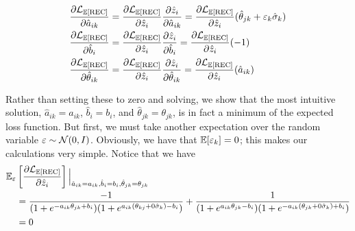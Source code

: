 \begin{equation}
  \begin{split}
  \frac{\partial \mathcal{L}_{\mathbb{E}[\text{REC}]}}{\partial \hat a_{ik}} &= 
  \frac{\partial \mathcal{L}_{\mathbb{E}[\text{REC}]}}{\partial \hat z_i}\frac{\partial \hat z_i}{\partial \hat a_{ik}} = \frac{\partial \mathcal{L}_{\mathbb{E}[\text{REC}]}}{\partial \hat z_i} (\hat \theta_{jk} + \varepsilon_k \hat \sigma_k) \\
  \frac{\partial \mathcal{L}_{\mathbb{E}[\text{REC}]}}{\partial \hat b_i} &= 
  \frac{\partial \mathcal{L}_{\mathbb{E}[\text{REC}]}}{\partial \hat z_i}\frac{\partial \hat z_i}{\partial \hat b_i} = \frac{\partial \mathcal{L}_{\mathbb{E}[\text{REC}]}}{\partial \hat z_i} (-1) \\
  \frac{\partial \mathcal{L}_{\mathbb{E}[\text{REC}]}}{\partial \hat \theta_{ik}} &= 
  \frac{\partial \mathcal{L}_{\mathbb{E}[\text{REC}]}}{\partial \hat z_i}\frac{\partial \hat z_i}{\partial \hat \theta_{ik}} = \frac{\partial \mathcal{L}_{\mathbb{E}[\text{REC}]}}{\partial \hat z_i} (\hat a_{ik}) 
\end{split}
 \label{eq:param_deriv}
\end{equation}

Rather than setting these to zero and solving, we show that the most intuitive solution, $\hat a_{ik} = a_{ik}$, $\hat b_i = b_i$, and $\hat \theta_{jk} = \theta_{jk}$, is in fact a minimum of the expected loss function. But first, we must take another expectation over the random variable $\varepsilon \sim \mathcal{N}(0,I)$. Obviously, we have that $\mathbb{E}[\varepsilon_k] = 0$; this makes our calculations very simple. Notice that we have
\begin{equation}
  \begin{split}
  \mathbb{E}_\varepsilon &\left[\frac{\partial \mathcal{L}_{\mathbb{E}[\text{REC}]}}{\partial \hat z_i}\right] \Big|_{\hat a_{ik} = a_{ik}, \hat b_i = b_i, \hat \theta_{jk} = \theta_{jk}} \\
  &= \frac{-1}{(1 + e^{-a_{ik}\theta_{jk} + b_i})(1 + e^{a_{ik} (\theta_{kj} + 0 \hat \sigma_k) - b_i})} + \frac{1}{(1 + e^{a_{ik}\theta_{jk} - b_i})(1 + e^{-a_{ik}(\theta_{jk} + 0 \hat \sigma_k) + b_i})} \\
  &= 0
\end{split}
\end{equation}


